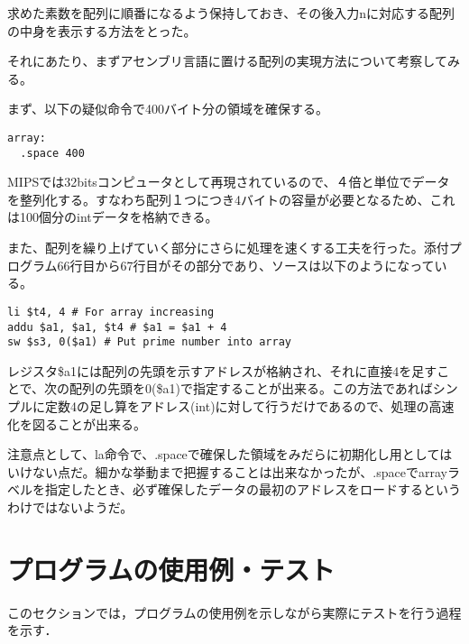 \documentclass[a4j]{jarticle}
\begin{document}


求めた素数を配列に順番になるよう保持しておき、その後入力nに対応する配列の中身を表示する方法をとった。

それにあたり、まずアセンブリ言語に置ける配列の実現方法について考察してみる。

まず、以下の疑似命令で400バイト分の領域を確保する。\\



\begin{lstlisting}
array:
  .space 400
\end{lstlisting}


MIPSでは32bitsコンピュータとして再現されているので、４倍と単位でデータを整列化する。すなわち配列１つにつき4バイトの容量が必要となるため、これは100個分のintデータを格納できる。

また、配列を繰り上げていく部分にさらに処理を速くする工夫を行った。添付プログラム66行目から67行目がその部分であり、ソースは以下のようになっている。\\

\begin{lstlisting}
li $t4, 4 # For array increasing
addu $a1, $a1, $t4 # $a1 = $a1 + 4
sw $s3, 0($a1) # Put prime number into array
\end{lstlisting}

レジスタ\$a1には配列の先頭を示すアドレスが格納され、それに直接4を足すことで、次の配列の先頭を0(\$a1)で指定することが出来る。この方法であればシンプルに定数4の足し算をアドレス(int)に対して行うだけであるので、処理の高速化を図ることが出来る。

注意点として、la命令で、.spaceで確保した領域をみだらに初期化し用としてはいけない点だ。細かな挙動まで把握することは出来なかったが、.spaceでarrayラベルを指定したとき、必ず確保したデータの最初のアドレスをロードするというわけではないようだ。


%
%

\section{プログラムの使用例・テスト}

このセクションでは，プログラムの使用例を示しながら実際にテストを行う過程を示す．
\end{document}
